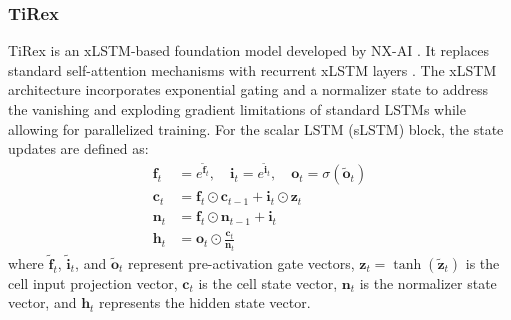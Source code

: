 \subsubsection{TiRex}
TiRex is an xLSTM-based foundation model developed by NX-AI \cite{auer2025tirex}. It replaces standard self-attention mechanisms with recurrent xLSTM layers \cite{xlstm}. The xLSTM architecture incorporates exponential gating and a normalizer state to address the vanishing and exploding gradient limitations of standard LSTMs while allowing for parallelized training. For the scalar LSTM (sLSTM) block, the state updates are defined as:
\begin{align}
\mathbf{f}_t &= e^{\tilde{\mathbf{f}}_t}, \quad \mathbf{i}_t = e^{\tilde{\mathbf{i}}_t}, \quad \mathbf{o}_t = \sigma(\tilde{\mathbf{o}}_t) \\
\mathbf{c}_t &= \mathbf{f}_t \odot \mathbf{c}_{t-1} + \mathbf{i}_t \odot \mathbf{z}_t \\
\mathbf{n}_t &= \mathbf{f}_t \odot \mathbf{n}_{t-1} + \mathbf{i}_t \\
\mathbf{h}_t &= \mathbf{o}_t \odot \frac{\mathbf{c}_t}{\mathbf{n}_t}
\end{align}
where $\tilde{\mathbf{f}}_t$, $\tilde{\mathbf{i}}_t$, and $\tilde{\mathbf{o}}_t$ represent pre-activation gate vectors, $\mathbf{z}_t = \tanh(\tilde{\mathbf{z}}_t)$ is the cell input projection vector, $\mathbf{c}_t$ is the cell state vector, $\mathbf{n}_t$ is the normalizer state vector, and $\mathbf{h}_t$ represents the hidden state vector. 

